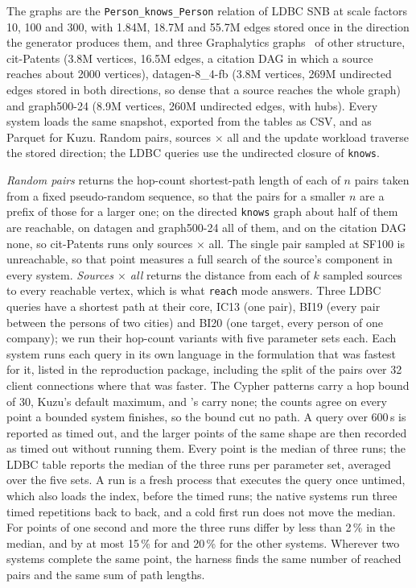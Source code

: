 The graphs are the \texttt{Person\_knows\_Person} relation of LDBC SNB at scale factors 10, 100 and 300, with 1.84M,
18.7M and 55.7M edges stored once in the direction the generator produces them, and three Graphalytics
graphs~\cite{iosup2016graphalytics} of other structure, cit-Patents (3.8M vertices, 16.5M edges, a citation DAG in
which a source reaches about 2000 vertices), datagen-8\_4-fb (3.8M vertices, 269M undirected edges stored in both
directions, so dense that a source reaches the whole graph) and graph500-24 (8.9M vertices, 260M undirected edges,
with hubs). Every system loads the same snapshot, exported from the \duckdb tables as CSV, and as Parquet for Kuzu.
Random pairs, sources $\times$ all and the update workload traverse the stored direction; the LDBC queries use the
undirected closure of \texttt{knows}.

\emph{Random pairs} returns the hop-count shortest-path length of each of $n$ pairs taken from a fixed pseudo-random
sequence, so that the pairs for a smaller $n$ are a prefix of those for a larger one; on the directed \texttt{knows}
graph about half of them are reachable, on datagen and graph500-24 all of them, and on the citation DAG none, so cit-Patents runs only sources $\times$ all. The single pair sampled at SF100 is unreachable, so that point measures a full search of the source's component in every system. \emph{Sources $\times$ all} returns the distance from each of $k$
sampled sources to every reachable vertex, which is what \texttt{reach} mode answers. Three LDBC queries have a shortest path at
their core, IC13 (one pair), BI19 (every pair between the persons of two cities) and BI20 (one target, every person
of one company); we run their hop-count variants with five parameter sets each. Each system runs each query in its own language in the formulation that was fastest for it, listed in the reproduction package, including the split of the pairs over 32 client connections where that was faster. The Cypher patterns
carry a hop bound of 30, Kuzu's default maximum, and \duckpgq's carry none; the counts agree on every point a bounded
system finishes, so the bound cut no path. A query over 600\,s is reported as timed out, and the larger points of the
same shape are then recorded as timed out without running them. Every point is the median of three runs; the LDBC
table reports the median of the three runs per parameter set, averaged over the five sets. A \duckpgq run is a fresh
process that executes the query once untimed, which also loads the index, before the timed runs; the native systems
run three timed repetitions back to back, and a cold first run does not move the median. For points of one second and more the three runs differ by less than 2\,\% in the median, and by at most 15\,\% for \duckpgq and 20\,\% for the other systems. Wherever two systems complete the same point, the harness finds the same number of reached pairs and the same sum
of path lengths.


